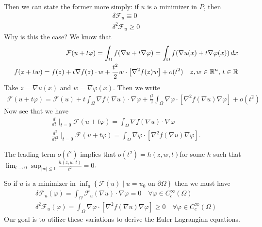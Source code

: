 \documentclass{memoir}
\begin{document}
Then we can state the former more simply: if \(u\) is a minimizer in \(P\), then
\begin{align*}
\delta \mathcal{F}_u \equiv 0\\
\delta^2 \mathcal{F}_u \geq 0
\end{align*}
Why is this the case? We know that
\begin{align*}
	\mathcal{F}(u+t\varphi ) = \int_\Omega f (\nabla u + t \nabla \varphi ) = \int_\Omega f(\nabla u(x) + t \nabla \varphi (x)) \,d x\\
	f(z+tw) = f(z) + t \nabla f(z)\cdot w + \frac{t^2}{2}w \cdot \left[ \nabla^2f(z) w \right] + o(t^2)\quad z,w \in \mathbb{R}^{n}, \, t \in \mathbb{R}
\end{align*}
Take \(z = \nabla u(x)\) and \( w = \nabla \varphi (x)\). Then we write
\begin{align*}
	\mathcal{F}(u+t\varphi ) = \mathcal{F}(u) + t \int_\Omega \nabla f (\nabla u) \cdot \nabla \varphi  + \frac{t^2}{2} \int_\Omega \nabla \varphi \cdot \left[ \nabla^2 f(\nabla u) \nabla \varphi  \right] + o(t^2)
\end{align*}
Now see that we have
\begin{align*}
	\frac{d}{dt}\mid_{t = 0} \mathcal{F}(u+t\varphi ) = \int_\Omega \nabla f(\nabla u) \cdot \nabla \varphi \\
	\frac{d^2}{dt^2}\mid_{t = 0} \mathcal{F}(u+t\varphi ) = \int_{\Omega } \nabla \varphi \cdot \left[ \nabla ^2 f(\nabla u) \nabla \varphi  \right] .
\end{align*}

\begin{rmrk}
The leading term \(o(t^2)\) implies that \(o(t^2) = h(z,w,t)\)for some \(h\) such that \(\lim_{t \to 0} \sup_{\left| w \right| \leq 1} \frac{h(z,w,t)}{t^2}= 0\).
\end{rmrk}
So if \(u\) is a minimizer in \(\inf_{u} \left\{\mathcal{F}(u) \mid u=u_0 \text{ on }\partial \Omega  \right\} \) then we must have
\begin{align*}
	\delta \mathcal{F}_u(\varphi ) = \int_{\Omega }\mathcal{F}_u (\nabla u) \cdot \nabla \varphi  = 0 \quad \forall \varphi \in C^{\infty}_c (\Omega )\\
	\delta^2 \mathcal{F}_u(\varphi ) = \int_{\Omega }\nabla \varphi \cdot \left[ \nabla^2 f(\nabla u) \nabla \varphi  \right] \geq 0 \quad \forall \varphi \in C^{\infty}_c(\Omega )
\end{align*}
Our goal is to utilize these variations to derive the Euler-Lagrangian equations.

\end{document}
